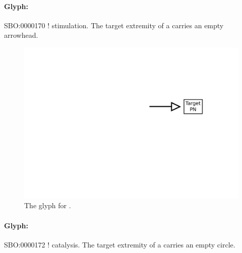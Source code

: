 \paragraph{Glyph: }\label{sec:techref:stimulation}


\begin{glyphDescription}
 \glyphSboTerm SBO:0000170 ! stimulation.
 \glyphEndPoint The target extremity of a  carries an empty arrowhead.
 \end{glyphDescription}

\begin{figure}[htb]
  \centering
  \includegraphics[scale = 0.5]{images/stimulation}
  \caption{The \PD glyph for .}
  \label{fig:techref:stimulation}
\end{figure}


\paragraph{Glyph: }\label{sec:techref:catalysis}


\begin{glyphDescription}
 \glyphSboTerm SBO:0000172 ! catalysis.
 \glyphNode The target extremity of a  carries an empty circle.
 \end{glyphDescription}

